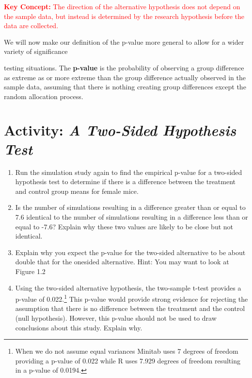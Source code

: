 \documentclass[
]{report}
\providecommand{\tightlist}{%
  \setlength{\itemsep}{0pt}\setlength{\parskip}{0pt}}
\theoremstyle{definition}
\theoremstyle{definition}
\theoremstyle{definition}
\theoremstyle{definition}
\theoremstyle{remark}
\begin{document}
\Large

\textbf{\textcolor{red}{Key Concept:}}
\textcolor{red}{The direction of the alternative hypothesis does not depend on the sample data, but instead is determined
by the research hypothesis before the data are collected.}

\normalsize

We will now make our definition of the p-value more general to allow for a wider variety of significance

testing situations. The \textbf{p-value} is the probability of observing a group difference as extreme as or more extreme
than the group difference actually observed in the sample data, assuming that there is nothing creating group
differences except the random allocation process.

\hypertarget{activity-a-two-sided-hypothesis-test}{%
\section*{\texorpdfstring{Activity: \emph{A Two-Sided Hypothesis Test}}{Activity: A Two-Sided Hypothesis Test}}\label{activity-a-two-sided-hypothesis-test}}

\begin{enumerate}
\def\labelenumi{\arabic{enumi}.}
\setcounter{enumi}{12}
\tightlist
\item
  Run the simulation study again to find the empirical p-value for a two-sided hypothesis test to determine
  if there is a difference between the treatment and control group means for female mice.
\item
  Is the number of simulations resulting in a difference greater than or equal to 7.6 identical to the number
  of simulations resulting in a difference less than or equal to -7.6? Explain why these two values
  are likely to be close but not identical.
\item
  Explain why you expect the p-value for the two-sided alternative to be about double that for the onesided
  alternative. Hint: You may want to look at Figure 1.2
\item
  Using the two-sided alternative hypothesis, the two-sample t-test provides a p-value of 0.022.\footnote{When we do not assume equal variances Minitab uses 7 degrees of freedom providing a p-value of 0.022 while R uses
    7.929 degrees of freedom resulting in a p-value of 0.0194.} This
  p-value would provide strong evidence for rejecting the assumption that there is no difference between
  the treatment and the control (null hypothesis). However, this p-value should not be used to draw
  conclusions about this study. Explain why.
\end{enumerate}
\end{document}
